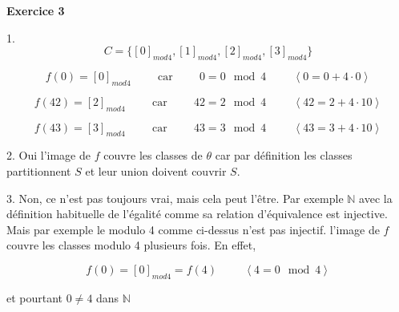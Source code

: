 \documentclass{article}
\newcommand{\tuple}[1]{\ensuremath{\left\langle #1 \right\rangle}}
\begin{document}
\textbf{Exercice 3}

\vspace{0.5cm}
1.
$$ C = \{ [0]_{mod{4}},[1]_{mod{4}}, [2]_{mod{4}},[3]_{mod{4}} \}$$

$$f(0) = [0]_{mod{4}} \hspace{1cm} \text{car} \hspace{1cm} 0 = 0 \mod{4} \hspace{1cm} \tuple{ 0 = 0 + 4\cdot0 }$$

$$f(42) = [2]_{mod{4}} \hspace{1cm} \text{car} \hspace{1cm} 42 = 2 \mod{4} \hspace{1cm} \tuple{ 42 = 2 + 4\cdot10 }$$

$$f(43) = [3]_{mod{4}} \hspace{1cm} \text{car} \hspace{1cm} 43 = 3 \mod{4} \hspace{1cm} \tuple{ 43 = 3 + 4\cdot10 }$$

2. Oui l'image de $f$ couvre les classes de $\theta$ car par définition les classes partitionnent $S$ et leur union doivent couvrir $S$.

3. Non, ce n’est pas toujours vrai, mais cela peut l’être. Par exemple $\mathbb{N}$ avec la définition habituelle de l'égalité comme sa relation d'équivalence est injective. Mais par exemple le modulo 4 comme ci-dessus n'est pas injectif. l'image de $f$ couvre les classes modulo 4 plusieurs fois. En effet,

$$ f(0) = [0]_{mod{4}} = f(4) \hspace{1cm} \tuple{ 4 = 0 \mod{4} } $$

et pourtant $ 0 \neq 4 $ dans $\mathbb{N}$
\end{document}
